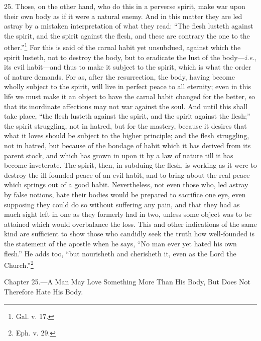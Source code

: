 25. Those, on the other hand, who do this in a perverse spirit, make war upon their own  body as if it were a natural enemy. And in this matter they are led astray by a mistaken interpretation of what they read: “The flesh lusteth against the spirit, and the spirit against the flesh, and these are contrary the one to the other.”\footnote{Gal. v. 17.} For this is said of the carnal habit yet unsubdued, against which the spirit lusteth, not to destroy the body, but to eradicate the lust of the body—\emph{i.e}., its evil habit—and thus to make it subject to the spirit, which is what the order of nature demands. For as, after the resurrection, the body, having become wholly subject to the spirit, will live in perfect peace to all eternity; even in this life we must make it an object to have the carnal habit changed for the better, so that its inordinate affections may not war against the soul. And until this shall take place, “the flesh lusteth against the spirit, and the spirit against the flesh;” the spirit struggling, not in hatred, but for the mastery, because it desires that what it loves should be subject to the higher principle; and the flesh struggling, not in hatred, but because of the bondage of habit which it has derived from its parent stock, and which has grown in upon it by a law of nature till it has become inveterate. The spirit, then, in subduing the flesh, is working as it were to destroy the ill-founded peace of an evil habit, and to bring about the real peace which springs out of a good habit. Nevertheless, not even those who, led astray by false notions, hate their bodies would be prepared to sacrifice one eye, even supposing they could do so without suffering any pain, and that they had as much sight left in one as they formerly had in two, unless some object was to be attained which would overbalance the loss. This and other indications of the same kind are sufficient to show those who candidly seek the truth how well-founded is the statement of the apostle when he says, “No man ever yet hated his own flesh.” He adds too, “but nourisheth and cherisheth it, even as the Lord the Church.”\footnote{Eph. v. 29.}


Chapter 25.—A Man May Love Something More Than His Body, But Does Not Therefore Hate His Body.

